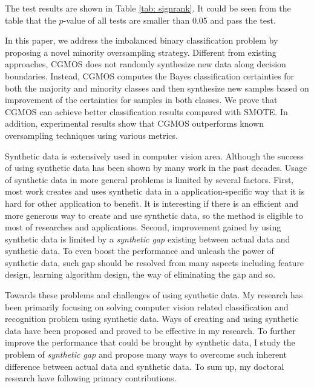 \documentclass{iitthesis}
\begin{document}
The test results are shown in Table \ref{tab: signrank}. It could be seen from the table that the $p$-value of all tests are smaller than 0.05 and pass the test. 

In this paper, we address the imbalanced binary classification problem by proposing a novel minority oversampling strategy. Different from existing approaches, CGMOS does not randomly synthesize new data along decision boundaries. Instead, CGMOS computes the Bayes classification certainties for both the majority and minority classes and then synthesize new samples based on improvement of the certainties for samples in both classes. We prove that CGMOS can achieve better classification results compared with SMOTE. In addition, experimental results show that CGMOS outperforms known oversampling techniques using various metrics.











\clearpage

 \label{chapter: conclusion}

Synthetic data is extensively used in computer vision area. Although the success of using synthetic data has been shown by many work in the past decades. Usage of synthetic data in more general problems is limited by several factors. First, most work creates and uses synthetic data in a application-specific way that it is hard for other application to benefit. It is interesting if there is an efficient and more generous way to create and use synthetic data, so the method is eligible to most of researches and applications. Second, improvement gained by using synthetic data is limited by a \textit{synthetic gap} existing between actual data and synthetic data. To even boost the performance and unleash the power of synthetic data, such gap should be resolved from many aspects including feature design, learning algorithm design, the way of eliminating the gap and so.

Towards these problems and challenges of using synthetic data. My research has been primarily focusing on solving computer vision related classification and recognition problem using synthetic data. Ways of creating and using synthetic data have been proposed and proved to be effective in my research. To further improve the performance that could be brought by synthetic data, I study the problem of \textit{synthetic gap} and propose many ways to overcome such inherent difference between actual data and synthetic data. To sum up, my doctoral research have following primary contributions.
\end{document}
